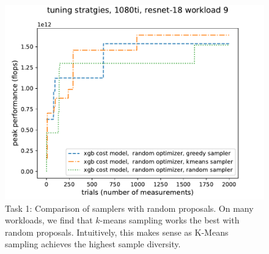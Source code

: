 \begin{figure}[tb]
\begin{center}
\includegraphics[width=\textwidth]{sys_figures/sampler1080tiresnet-18_9_.pdf}
\caption{Task 1: Comparison of samplers with random proposals. On many workloads, we find that $k$-means sampling works the best with random proposals. Intuitively, this makes sense as K-Means sampling achieves the highest sample diversity.}
\label{fig:samplers}
\end{center}
\end{figure}

